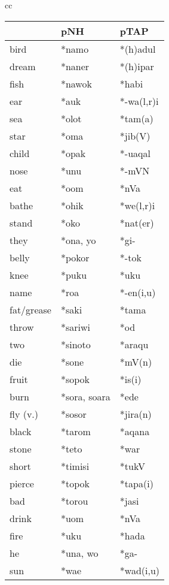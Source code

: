\begin{table}[p]
\begin{tabular}{cc}
\begin{tabular}{lll} 
 	& \rm  \textbf{pNH\ilt{proto-North-Halmahera}}	&  \rm \textbf{pTAP\ilt{proto-Timor Alor Pantar}}\\
    \midrule
bird	&  *namo	&  *(h)adul\\
dream	&  *naner{\ddag}	&  *(h)ipar\\
fish	&  *nawok	&  *habi\\
ear	&  *{\ng}auk	&  *-wa(l,r)i\\
sea	&  *{\ng}olot	&  *tam(a)\\
star	&  *{\ng}oma	&  *jib(V)\\
child	&  *{\ng}opak	&  *-uaqal\footnotemark{}\\
nose	&  *{\ng}unu{\ng}	&  *-mVN\\
eat	&  *o{\dDOT}om	&  *nVa\\
bathe	&  *ohik{\ddag}	&  *we(l,r)i\\
stand	&  *oko	&  *nat(er)\\
they	&  *ona, yo	&  *gi- {\ddag}\\
belly	&  *pokor	&  *-tok {\ddag}\\
knee	&  *puku	&  *uku {\ddag}\\
name	&  *ro{\ng}a	&  *-en(i,u) {\ddag}\\
fat/grease	&  *saki	&  *tama {\ddag}\\
throw	&  *sariwi	&  *od {\ddag}\\
two	&  *sinoto	&  *araqu {\ddag}\\
die 	&  *sone{\ng}	&  *mV(n)\\
fruit	&  *sopok	&  *is(i) {\ddag}\\
burn	&  *sora, so{\ng}ara	&  *ede {\ddag}\\
fly (v.)	&  *sosor	&  *jira(n) {\ddag}\\
black	&  *tarom	&  *aqana {\ddag}\\
stone	&  *teto	&  *war\\
short	&  *timisi	&  *tukV {\ddag}\\
{\lightgreycell}pierce	& {\lightgreycell} *topok	& {\lightgreycell} *tapa(i)\\
bad	&  *torou	&  *jasi {\ddag}\\
drink	&  *u{\dDOT}om	&  *nVa\\
fire	&  *uku	&  *hada\\
he	&  *una, wo	&  *ga- {\ddag}\\
sun	&  *wa{\ng}e	&  *wad(i,u)\\ 
\end{tabular}
\\
\mybottomline
\end{tabular}
\end{table}
\clearpage

